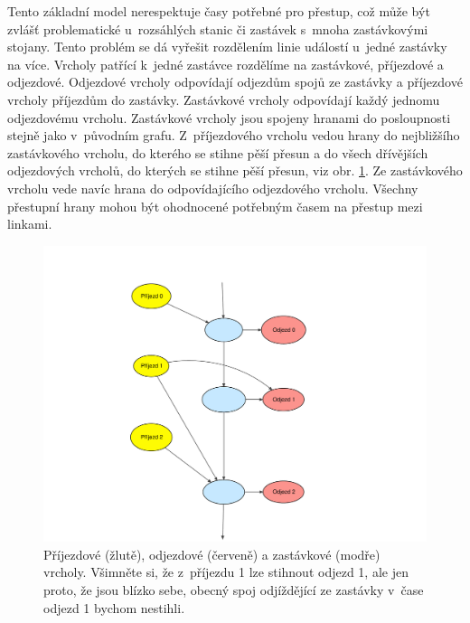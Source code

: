 Tento základní model nerespektuje časy potřebné pro přestup, což může být
zvlášť problematické u~rozsáhlých stanic či zastávek s~mnoha zastávkovými
stojany. Tento problém se dá vyřešit rozdělením linie událostí u~jedné zastávky
na více. Vrcholy patřící k~jedné zastávce rozdělíme na zastávkové, příjezdové a
odjezdové. Odjezdové vrcholy odpovídají odjezdům spojů ze zastávky a příjezdové
vrcholy příjezdům do zastávky. Zastávkové vrcholy odpovídají každý jednomu
odjezdovému vrcholu. Zastávkové vrcholy jsou spojeny hranami do posloupnosti
stejně jako v~původním grafu. Z~příjezdového vrcholu vedou hrany do nejbližšího
zastávkového vrcholu, do kterého se stihne pěší přesun a do všech dřívějších
odjezdových vrcholů, do kterých se stihne pěší přesun, viz obr.
\ref{fig:time-expanded}. Ze zastávkového vrcholu
vede navíc hrana do odpovídajícího odjezdového vrcholu. Všechny přestupní hrany
mohou být ohodnocené potřebným časem na přestup mezi linkami. 
\begin{figure}[h]
  \centering
    \includegraphics[width=\textwidth]{../img/time-expanded.pdf}
  \caption{Příjezdové (žlutě), odjezdové (červeně) a zastávkové (modře) vrcholy.
  Všimněte si, že z~příjezdu 1 lze stihnout odjezd 1, ale jen proto, že jsou
  blízko sebe, obecný spoj odjíždějící ze zastávky v~čase odjezd 1 bychom
  nestihli.}
  \label{fig:time-expanded}
\end{figure}

